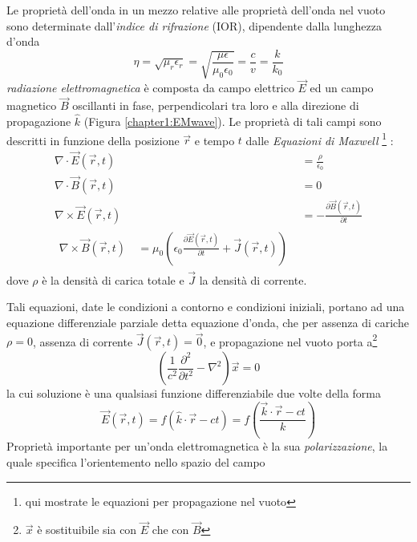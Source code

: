 Le propriet\`a dell'onda in un mezzo relative alle propriet\`a dell'onda nel vuoto sono determinate dall'\textit{indice di rifrazione} (IOR), dipendente
dalla lunghezza d'onda
\[ \eta = \sqrt{\mu_r \epsilon_r} = \sqrt{\frac{\mu \epsilon}{\mu_0 \epsilon_0}} = \frac{c}{v} = \frac{k}{k_0} \]
\textit{radiazione elettromagnetica} \`e composta da campo elettrico $\overrightarrow{E}$ ed un campo magnetico 
$\overrightarrow{B}$ oscillanti in fase, perpendicolari tra loro e alla direzione di propagazione $\hat{k}$ (Figura \ref{chapter1:EMwave}). 
Le propriet\`a di tali campi sono descritti in funzione della posizione $\overrightarrow{r}$ e tempo $t$ dalle \textit{Equazioni di Maxwell}
\footnote{qui mostrate le equazioni per propagazione nel vuoto}
\cite{pegoraro}:
\begin{align}
	\nabla \cdot \overrightarrow{E}(\overrightarrow{r}, t) &= \frac{\rho}{\epsilon_0} \\
	\nabla \cdot \overrightarrow{B}(\overrightarrow{r}, t) &= 0 \\
	\nabla \times \overrightarrow{E}(\overrightarrow{r}, t) &= -\frac{\partial\overrightarrow{B}(\overrightarrow{r}, t)}{\partial t} \\
	\begin{split}
	\nabla \times \overrightarrow{B}(\overrightarrow{r}, t) \ 
	&= \mu_0 \left( \epsilon_0\frac{\partial \overrightarrow{E}(\overrightarrow{r}, t)}{\partial t} + \overrightarrow{J}(\overrightarrow{r}, t) \right)
	\end{split}
\end{align}
dove $\rho$ \`e la densit\`a di carica totale e $\overrightarrow{J}$ la densit\`a di corrente.\par
Tali equazioni, date le condizioni a contorno e condizioni iniziali, portano ad una equazione differenziale parziale detta equazione d'onda, che 
per assenza di cariche $\rho = 0$, assenza di corrente $\overrightarrow{J}(\overrightarrow{r}, t) = \overrightarrow{0}$, e propagazione nel vuoto 
porta a\footnote{$\overrightarrow{x}$ \`e sostituibile sia con $\overrightarrow{E}$ che con $\overrightarrow{B}$}
\[ \left(\frac{1}{c^2}\frac{\partial^2}{\partial t^2} - \nabla^2\right) \overrightarrow{x} = 0\]
la cui soluzione \`e una qualsiasi funzione differenziabile due volte della forma
\[ \overrightarrow{E}(\overrightarrow{r}, t) = f(\hat{k}\cdot\overrightarrow{r}-ct) 
	= f\left(\frac{\overrightarrow{k}\cdot\overrightarrow{r} - ct}{k}\right) \]
Propriet\`a importante per un'onda elettromagnetica \`e la sua \textit{polarizzazione}, la quale specifica l'orientemento nello spazio del campo
